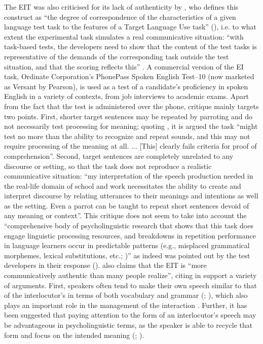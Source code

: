 The EIT was also criticised for its lack of authenticity by \citet{Chun2006}, who defines this construct as “the degree of correspondence of the characteristics of a given language test task to the features of a Target Language Use task” (\citealt[23]{BachmanPalmer2009}), i.e. to what extent the experimental task simulates a real communicative situation: “with task-based tests, the developers need to show that the content of the test tasks is representative of the demands of the corresponding task outside the test situation, and that the scoring reflects this” \citep[43]{Luoma2004}. A commercial version of the EI task, Ordinate Corporation’s PhonePass Spoken English Test–10 (now marketed as Versant by Pearson), is used as a test of a candidate’s proficiency in spoken English in a variety of contexts, from job interviews to academic exams. Apart from the fact that the test is administered over the phone,  critique mainly targets two points. First, shorter target sentences may be repeated by parroting and do not necessarily test processing for meaning; quoting \citet[79]{Buck2001}, it is argued the task “might test no more than the ability to recognize and repeat sounds, and this may not require processing of the meaning at all. ... [This] clearly fails  criteria for proof of comprehension”. Second, target sentences are completely unrelated to any discourse or setting, so that the task does not reproduce a realistic communicative situation: “my interpretation of the speech production needed in the real-life domain of school and work necessitates the ability to create and interpret discourse by relating utterances to their meanings and intentions as well as the setting. Even a parrot can be taught to repeat short sentences devoid of any meaning or context”. This critique does not seem to take into account the “comprehensive body of psycholinguistic research that shows that this task does engage linguistic processing resources, and breakdowns in repetition performance in language learners occur in predictable patterns (e.g., misplaced grammatical morphemes, lexical substitutions, etc.; \citealt{EllisEtAl2006, Radloff1991})” as indeed was pointed out by the test developers in their response (\citealt[163--164]{DowneyEtAl2008}). \citet[330]{Van-Moere2012} also claims that the EIT is “more communicatively authentic than many people realize”, citing in support a variety of arguments. First, speakers often tend to make their own speech similar to that of the interlocutor’s in terms of both vocabulary and grammar (\citealt[313]{Levinson1983}; \citealt[89]{BrownYule1983}), which also plays an important role in the management of the interaction \citep[52]{Tannen2007}. Further, it has been suggested that paying attention to the form of an interlocutor’s speech may be advantageous in psycholinguistic terms, as the speaker is able to recycle that form and focus on the intended meaning (\citealt{Swain1985}; \citealt{BygateEtAl2001}).

